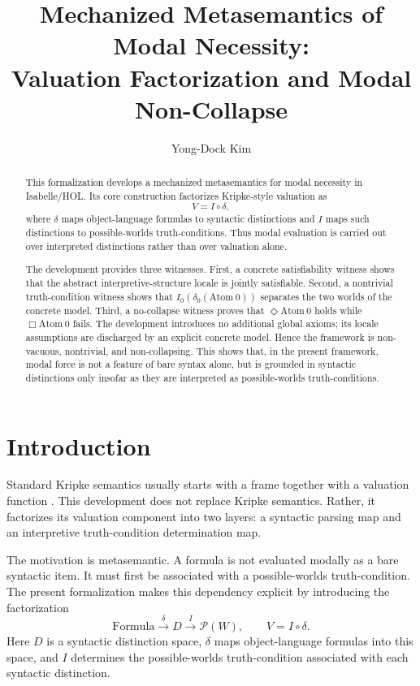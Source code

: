 \documentclass[11pt,a4paper]{article}
\begin{document}
\title{Mechanized Metasemantics of Modal Necessity:\\
Valuation Factorization and Modal Non-Collapse}
\author{Yong-Dock Kim}
\maketitle

\nocite{*}

\begin{abstract}
This formalization develops a mechanized metasemantics for modal necessity in Isabelle/HOL. Its core construction factorizes Kripke-style valuation as
\[
V = I \circ \delta,
\]
where $\delta$ maps object-language formulas to syntactic distinctions and $I$ maps such distinctions to possible-worlds truth-conditions. Thus modal evaluation is carried out over interpreted distinctions rather than over valuation alone.

The development provides three witnesses. First, a concrete satisfiability witness shows that the abstract interpretive-structure locale is jointly satisfiable. Second, a nontrivial truth-condition witness shows that $I_0(\delta_0(\mathrm{Atom}\ 0))$ separates the two worlds of the concrete model. Third, a no-collapse witness proves that $\Diamond \mathrm{Atom}\ 0$ holds while $\Box \mathrm{Atom}\ 0$ fails. The development introduces no additional global axioms; its locale assumptions are discharged by an explicit concrete model. Hence the framework is non-vacuous, nontrivial, and non-collapsing. This shows that, in the present framework, modal force is not a feature of bare syntax alone, but is grounded in syntactic distinctions only insofar as they are interpreted as possible-worlds truth-conditions.
\end{abstract}

\tableofcontents
\newpage

\section{Introduction}

Standard Kripke semantics usually starts with a frame together with a valuation function \cite{Kripke1963}. This development does not replace Kripke semantics. Rather, it factorizes its valuation component into two layers: a syntactic parsing map and an interpretive truth-condition determination map.

The motivation is metasemantic. A formula is not evaluated modally as a bare syntactic item. It must first be associated with a possible-worlds truth-condition. The present formalization makes this dependency explicit by introducing the factorization
\[
\mathrm{Formula} \xrightarrow{\delta} D \xrightarrow{I} \mathcal{P}(W),
\qquad
V = I \circ \delta.
\]
Here $D$ is a syntactic distinction space, $\delta$ maps object-language formulas into this space, and $I$ determines the possible-worlds truth-condition associated with each syntactic distinction.
\end{document}

